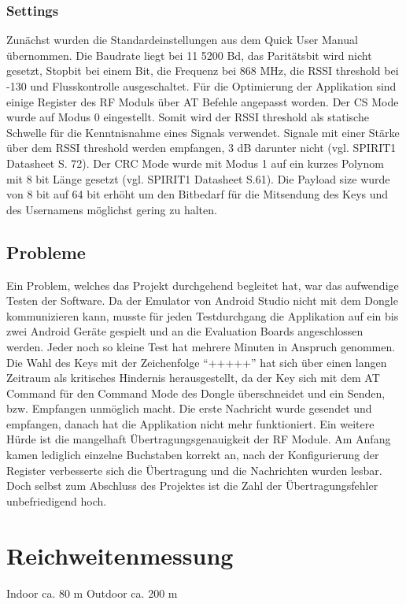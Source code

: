 \documentclass[a4paper, 12.5pt]{scrartcl}
\begin{document}
\subsubsection{Settings}

Zunächst wurden die Standardeinstellungen aus dem Quick User Manual übernommen. Die Baudrate liegt bei 11 5200 Bd, das Paritätsbit wird nicht gesetzt, Stopbit bei einem Bit, die Frequenz bei 868 MHz, die RSSI threshold bei -130 und Flusskontrolle ausgeschaltet. Für die Optimierung der Applikation sind einige Register des RF Moduls über AT Befehle angepasst worden. Der CS Mode wurde auf Modus 0 eingestellt. Somit wird der RSSI threshold als statische Schwelle für die Kenntnisnahme eines Signals verwendet. Signale mit einer Stärke über dem RSSI threshold werden empfangen, 3 dB darunter nicht (vgl. SPIRIT1 Datasheet S. 72). Der CRC Mode wurde mit Modus 1 auf ein kurzes Polynom mit 8 bit Länge gesetzt (vgl. SPIRIT1 Datasheet S.61). Die Payload size wurde von 8 bit auf 64 bit erhöht um den Bitbedarf für die Mitsendung des Keys und des Usernamens möglichst gering zu halten.

\subsection{Probleme}

Ein Problem, welches das Projekt durchgehend begleitet hat, war das aufwendige Testen der Software. Da der Emulator von Android Studio nicht mit dem Dongle kommunizieren kann, musste für jeden Testdurchgang die Applikation auf ein bis zwei Android Geräte gespielt und an die Evaluation Boards angeschlossen werden. Jeder noch so kleine Test hat mehrere Minuten in Anspruch genommen.
Die Wahl des Keys mit der Zeichenfolge “+++++” hat sich über einen langen Zeitraum als kritisches Hindernis herausgestellt, da der Key sich mit dem AT Command für den Command Mode des Dongle überschneidet und ein Senden, bzw. Empfangen unmöglich macht. Die erste Nachricht wurde gesendet und empfangen, danach hat die Applikation nicht mehr funktioniert. 
Ein weitere Hürde ist die mangelhaft Übertragungsgenauigkeit der RF Module. Am Anfang kamen lediglich einzelne Buchstaben korrekt an, nach der Konfigurierung der Register verbesserte sich die Übertragung und die Nachrichten wurden lesbar. Doch selbst zum Abschluss des Projektes ist die Zahl der Übertragungsfehler unbefriedigend hoch.


\section{Reichweitenmessung}
Indoor ca. 80 m
Outdoor ca. 200 m
\end{document}
